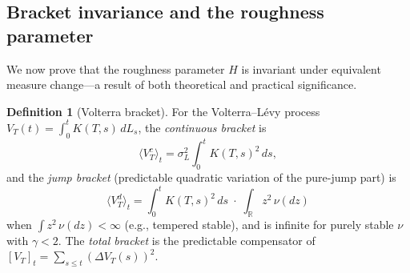 \documentclass[11pt,a4paper]{article}
\theoremstyle{plain}
\theoremstyle{definition}
\newtheorem{definition}[theorem]{Definition}
\theoremstyle{remark}
\newcommand{\R}{\mathbb{R}}
\begin{document}

\subsection{Bracket invariance and the roughness parameter}
\label{sec:bracket-inv}

We now prove that the roughness parameter $H$ is invariant
under equivalent measure change---a result of both theoretical
and practical significance.

\begin{definition}[Volterra bracket]\label{def:volterra-bracket}
For the Volterra--L\'evy process $V_T(t) = \int_0^t K(T,s)\,dL_s$,
the \emph{continuous bracket} is
\begin{equation}\label{eq:cont-bracket}
  \langle V_T^c \rangle_t
  = \sigma_L^2\int_0^t K(T,s)^2\,ds,
\end{equation}
and the \emph{jump bracket} (predictable quadratic variation
of the pure-jump part) is
\begin{equation}\label{eq:jump-bracket}
  \langle V_T^d \rangle_t
  = \int_0^t K(T,s)^2\,ds\;\cdot\;\int_\R z^2\,\nu(dz)
\end{equation}
when $\int z^2\,\nu(dz) < \infty$ (e.g., tempered stable),
and is infinite for purely stable $\nu$ with $\gamma < 2$.
The \emph{total bracket} is the predictable compensator of
$[V_T]_t = \sum_{s \leq t}(\Delta V_T(s))^2$.
\end{definition}
\end{document}
